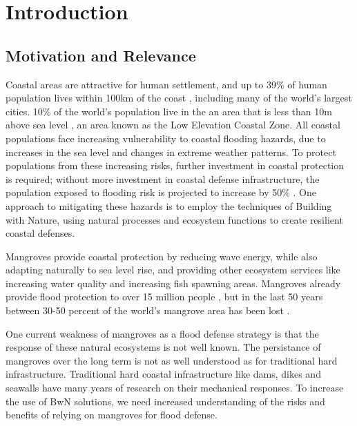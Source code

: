 \chapter{Introduction}


\section{Motivation and Relevance}

Coastal areas are attractive for human settlement, and up to 39\% of human population lives within 100km of the coast \parencite{Magdalena2021}, including many of the world's largest cities. 10\% of the world's population live in the an area that is less than 10m above sea level \parencite{Neumann2015,Lichter2011}, an area known as the Low Elevation Coastal Zone. All coastal populations face increasing vulnerability to coastal flooding hazards, due to increases in the sea level and changes in extreme weather patterns. To protect populations from these increasing risks, further investment in coastal protection is required; without more investment in coastal defense infrastructure, the population exposed to flooding risk is projected to increase by 50\% \Parencite{Kirezci2020}. One approach to mitigating these hazards is to employ the techniques of Building with Nature, using natural processes and ecosystem functions to create resilient coastal defenses. 

Mangroves provide coastal protection by reducing wave energy, while also adapting naturally to sea level rise, and providing other ecosystem services like increasing water quality and increasing fish spawning areas. Mangroves already provide flood protection to over 15 million people \parencite{Menendez2020}, but in the last 50 years between 30-50 percent of the world's mangrove area has been lost \parencite{Goldberg2020}.

One current weakness of mangroves as a flood defense strategy is that the response of these natural ecosystems is not well known. The persistance of mangroves over the long term is not as well understood as for traditional hard infrastructure. Traditional hard coastal infrastructure like dams, dikes and seawalls have many years of research on their mechanical responses. To increase the use of BwN solutions, we need increased understanding of the risks and benefits of relying on mangroves for flood defense.

